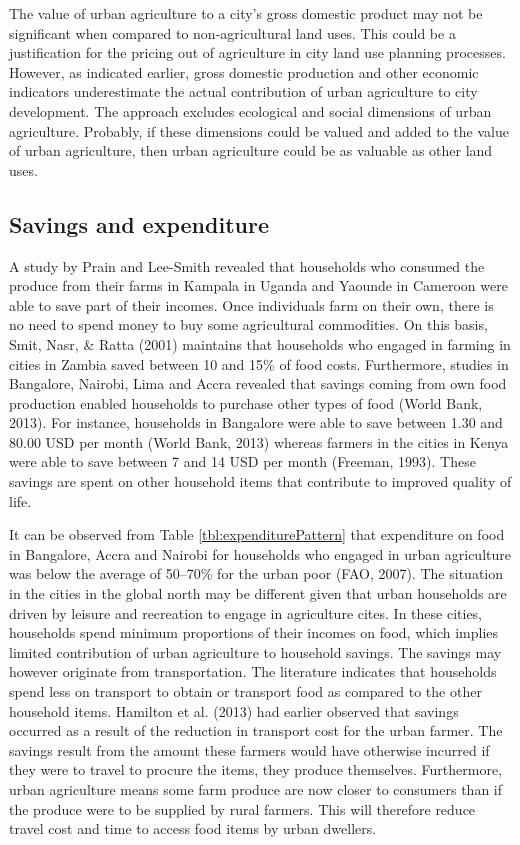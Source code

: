 The value of urban agriculture to a city's gross domestic product may not be significant when compared to non-agricultural land uses. This could be a justification for the pricing out of agriculture in city land use planning processes. However, as indicated earlier, gross domestic production and other economic indicators underestimate the actual contribution of urban agriculture to city development. The approach excludes ecological and social dimensions of urban agriculture. Probably, if these dimensions could be valued and added to the value of urban agriculture, then urban agriculture could be as valuable as other land uses.

\subsection{Savings and expenditure}

A study by Prain and Lee-Smith \cite{Prain2010} revealed that households who consumed the produce from their farms in Kampala in Uganda and Yaounde in Cameroon were able to save part of their incomes. Once individuals farm on their own, there is no need to spend money to buy some agricultural commodities. On this basis, Smit, Nasr, \& Ratta (2001) maintains that households who engaged in farming in cities in Zambia saved between 10 and 15\% of food costs. Furthermore, studies in Bangalore, Nairobi, Lima and Accra revealed that savings coming from own food production enabled households to purchase other types of food (World Bank, 2013). For instance, households in Bangalore were able to save between 1.30 and 80.00 USD per month (World Bank, 2013) whereas farmers in the cities in Kenya were able to save between 7 and 14 USD per month (Freeman, 1993). These savings are spent on other household items that contribute to improved quality of life.

It can be observed from Table \ref{tbl:expenditurePattern} that expenditure on food in Bangalore, Accra and Nairobi for households who engaged in urban agriculture was below the average of 50–70\% for the urban poor (FAO, 2007). The situation in the cities in the global north may be different given that urban households are driven by leisure and recreation to engage in agriculture cites. In these cities, households spend minimum proportions of their incomes on food, which implies limited contribution of urban agriculture to household savings. The savings may however originate from transportation. The literature indicates that households spend less on transport to obtain or transport food as compared to the other household items. Hamilton et al. (2013) had earlier observed that savings occurred as a result of the reduction in transport cost for the urban farmer. The savings result from the amount these farmers would have otherwise incurred if they were to travel to procure the items, they produce themselves. Furthermore, urban agriculture means some farm produce are now closer to consumers than if the produce were to be supplied by rural farmers. This will therefore reduce travel cost and time to access food items by urban dwellers.


